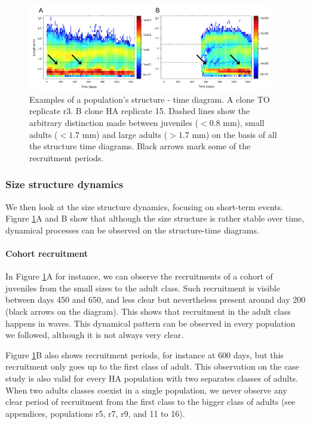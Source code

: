 \begin{figure}[!ht]
\begin{center}
\includegraphics[width=0.95\textwidth]{3-1_ChapExp1/Fig/AnnSP1}
\caption[Examples of a population's
structure]{Examples of a population's structure - time diagram. A clone TO
replicate r3. B clone HA replicate 15. Dashed lines show the arbitrary
distinction made between juveniles ($<0.8$ mm), small adults ($<1.7$ mm) and
large adults ($>1.7$ mm) on the basis of all the structure time diagrams. Black
arrows mark some of the recruitment periods.}
\label{fig:AnSP1}
\end{center}
\end{figure}

\subsubsection{Size structure dynamics}

 We then look at the size structure dynamics, focusing on short-term events.
Figure \ref{fig:AnSP1}A and B show that although the size structure is rather
stable over time, dynamical processes can be observed on the structure-time
diagrams.

\paragraph{Cohort recruitment}

In Figure \ref{fig:AnSP1}A for instance, we can observe the recruitments of a cohort of
juveniles from the small sizes to the adult class. Such recruitment is
visible between days 450 and 650, and less clear but nevertheless present around
day 200 (black arrows on the diagram). This shows that recruitment in the adult class happens in waves. This dynamical pattern can be observed in every
population we followed, although it is not always very clear.

Figure \ref{fig:AnSP1}B also shows recruitment periods, for instance at 600
days, but this recruitment only goes up to the first class of adult. This observation on the
case study is also valid for every HA population with two separates classes of
adults. When two adults classes coexist in a single population, we
never observe any clear period of recruitment from the first class to the bigger
class of adults (see appendices, populations r5, r7, r9, and 11 to 16).

